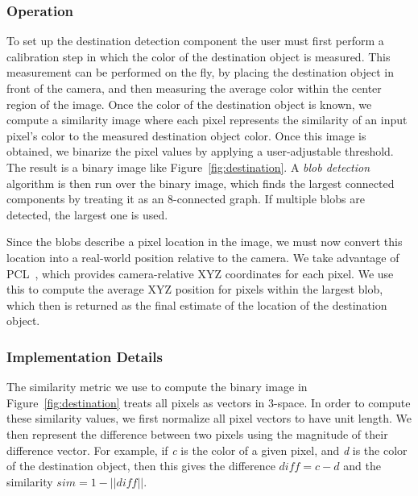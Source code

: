 \subsubsection{Operation}
\label{sec:technical-dest-op}

To set up the destination detection component the user must first perform a
calibration step in which the color of the destination object is measured.
This measurement can be performed on the fly, by placing the
destination object in front of the camera, and then measuring the average 
color within the center region of the image. Once the color of the destination
object is known, we compute a similarity image where each pixel represents the 
similarity of an input pixel's color to the measured destination object color. Once 
this image is obtained, we binarize the pixel values by applying a 
user-adjustable threshold. The result is a binary image like
Figure~\ref{fig:destination}. A \emph{blob detection} algorithm is then run over the 
binary image, which finds the largest connected components by treating it as an 
8-connected graph. If multiple blobs are detected, the largest one is used.

Since the blobs describe a pixel location in the image, we must now convert 
this location into a real-world position relative to the camera. We take
advantage of PCL~\cite{pcl-website}, which provides camera-relative XYZ coordinates
for each pixel. We use this to compute the average XYZ position for pixels
within the largest blob, which then is returned as the final estimate of the location
of the destination object. 


\subsubsection{Implementation Details}
\label{sec:technical-dest-impl}

The similarity metric we use to compute the binary image in Figure~\ref{fig:destination}
treats all pixels as vectors in 3-space. In order
to compute these similarity values, we first normalize all pixel vectors
to have unit length. We then represent the difference between two pixels using the
magnitude of their difference vector. For example, if \emph{c} is the color of a
given pixel, and \emph{d} is the color of the destination object, then this gives the 
difference \begin{math} \textit{diff} = c - d \end{math} and the similarity 
\begin{math}\textit{sim} = 1 - ||\textit{diff}|| \end{math}.

